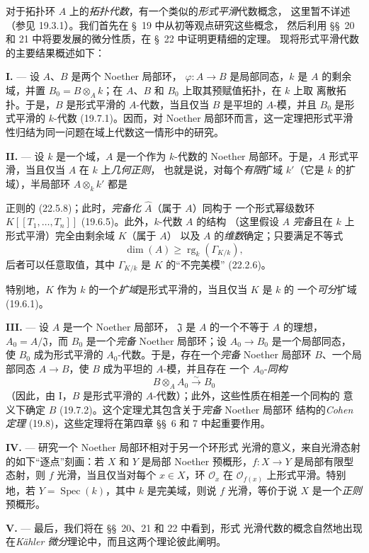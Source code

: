 \begin{env}[19.0.2]
\label{0.19.0.2-fr}
对于拓扑环 $A$ 上的\emph{拓扑代数}，有一个类似的\emph{形式平滑}代数概念，
这里暂不详述（参见 19.3.1）。我们首先在 §~19 中从初等观点研究这些概念，
然后利用 §§~20 和 21 中将要发展的微分性质，在 §~22 中证明更精细的定理。
现将形式平滑代数的主要结果概述如下：

\medskip\noindent\textbf{I.} --- 设 $A$、$B$ 是两个 Noether 局部环，
$\varphi:A\to B$ 是局部同态，$k$ 是 $A$ 的剩余域，并置
$B_0=B\otimes_A k$；在 $A$、$B$ 和 $B_0$ 上取其预赋值拓扑，在 $k$ 上取
离散拓扑。于是，$B$ 是形式平滑的 $A$-代数，当且仅当 $B$ 是平坦的
$A$-模，并且 $B_0$ 是形式平滑的 $k$-代数 (19.7.1)。因而，对 Noether
局部环而言，这一定理把形式平滑性归结为同一问题在域上代数这一情形中的研究。

\medskip\noindent\textbf{II.} --- 设 $k$ 是一个域，$A$ 是一个作为 $k$-代数的
Noether 局部环。于是，$A$ 形式平滑，当且仅当 $A$ 在 $k$ 上\emph{几何正则}，
也就是说，对每个\emph{有限}扩域 $k'$（它是 $k$ 的扩域），半局部环
$A\otimes_k k'$ 都是


\noindent 正则的 (22.5.8)；此时，\emph{完备化} $\widehat A$（属于 $A$）同构于
一个形式幂级数环 $K[[T_1,\ldots,T_n]]$ (19.6.5)。此外，$k$-代数 $A$ 的结构
（这里假设 $A$ \emph{完备}且在 $k$ 上形式平滑）完全由剩余域 $K$（属于 $A$）
以及 $A$ 的\emph{维数}确定；只要满足不等式
\[
  \dim(A)\geq \operatorname{rg}_k(\Gamma_{K/k}),
\]
后者可以任意取值，其中 $\Gamma_{K/k}$ 是 $K$ 的“不完美模” (22.2.6)。

特别地，$K$ 作为 $k$ 的一个\emph{扩域}是形式平滑的，当且仅当 $K$ 是 $k$ 的
一个\emph{可分}扩域 (19.6.1)。

\medskip\noindent\textbf{III.} --- 设 $A$ 是一个 Noether 局部环，
$\mathfrak J$ 是 $A$ 的一个不等于 $A$ 的理想，$A_0=A/\mathfrak J$，而
$B_0$ 是一个\emph{完备} Noether 局部环；设 $A_0\to B_0$ 是一个局部同态，
使 $B_0$ 成为形式平滑的 $A_0$-代数。于是，存在一个\emph{完备} Noether
局部环 $B$、一个局部同态 $A\to B$，使 $B$ 成为平坦的 $A$-模，并且存在
一个 $A_0$-\emph{同构}
\[
  B\otimes_A A_0\xrightarrow{\sim}B_0
\]
（因此，由 I，$B$ 是形式平滑的 $A$-代数）；此外，这些性质在相差一个同构的
意义下确定 $B$ (19.7.2)。这个定理尤其包含关于\emph{完备} Noether 局部环
结构的\emph{Cohen 定理} (19.8)，这些定理将在第四章 §§~6 和 7 中起重要作用。

\medskip\noindent\textbf{IV.} --- 研究一个 Noether 局部环相对于另一个环形式
光滑的意义，来自光滑态射的如下“逐点”刻画：若 $X$ 和 $Y$ 是局部 Noether
预概形，$f:X\to Y$ 是局部有限型态射，则 $f$ 光滑，当且仅当对每个
$x\in X$，环 $\mathcal O_x$ 在 $\mathcal O_{f(x)}$ 上形式平滑。特别地，若
$Y=\operatorname{Spec}(k)$，其中 $k$ 是完美域，则说 $f$ 光滑，等价于说 $X$
是一个\emph{正则}预概形。

\medskip\noindent\textbf{V.} --- 最后，我们将在 §§~20、21 和 22 中看到，形式
光滑代数的概念自然地出现在\emph{Kähler 微分}理论中，而且这两个理论彼此阐明。
\end{env}

